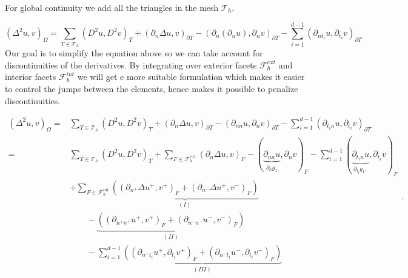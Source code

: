 For global continuity we add all the triangles in the mesh $\mathcal{T} _{h}$.

\begin{equation}
\label{eq:bi_basic_dg2}
\left( \Delta  ^{2} u,v \right) _{\Omega } = \sum_{T \in  \mathcal{T} _{h}}^{}  ( D^2 u, D^2v)_{T } + ( \partial _{n}  \Delta u, v )_{\partial T} -( \partial _{n} ( \partial_{n}u ), \partial _{n} v  )_{\partial T}-\sum_{i=1}^{d-1} ( \partial _{n t_{i}} u , \partial _{t_{i}} v  )_{\partial T}
\end{equation}
Our goal is to simplify the equation above so we can take account for discontinuities of the derivatives.
By integrating over exterior facets $\mathcal{F} _{h}^{ext}$ and interior facets $\mathcal{F} _{h}^{int}$ we will get e more suitable formulation which makes it easier to control the jumps between the elements, hence makes it possible to penalize discontinuities.

\begin{equation*}
    \begin{split}
 ( \Delta  ^{2} u,v ) _{\Omega }  =&\sum_{T\in \mathcal{T} _{h}}^{} ( D^2u,D^2v ) _{T }  + (\partial _{n} \Delta  u,v)_{\partial T} - (\partial _{nn} u, \partial _{n}v )_{\partial T}  - \sum_{i=1}^{d-1} ( \partial _{t_{i}n}u , \partial _{t_{i}} v  )_{\partial T}   \\
= &\sum_{T\in \mathcal{T} _{h}}^{} ( D^2u,D^2v ) _{T }  + \sum_{F \in \mathcal{F}_{h}^{ext} }^{}  (\partial _{n} \Delta  u,v)_{F} - (\underbrace{\partial _{nn} u}_{ \partial _{n} g_{1}} , \partial _{n}v )_{F}  - \sum_{i=1}^{d-1} ( \underbrace{\partial _{ t_{i}n} u }_{  \partial_{ t_{i} } g_{1},  }, \partial _{t_{i}} v
)_{F}     \\
   &  + \sum_{F \in \mathcal{F} _{h}^{int}}^{} \underbrace{\left( (\partial _{n^{+}} \Delta  u^{+}
        ,v^{+} )_{F}
+ \left(\partial _{n^{-}} \Delta  u^{+} ,v^{-}\right)_{F}  \right)}_{(I)}    \\
    &\quad \quad  -
\underbrace{\left( \left(\partial _{n^{+}n^{+}} u^{+}, v^{+} \right) _{F} + \left(\partial _{n^{-}n^{-}} u^{-}, v^{-}
\right) _{F} \right) }_{(II)} \\
   &  \quad \quad - \sum_{i=1}^{d-1}\underbrace{( (\partial _{n^{+}t_{i}} u^{+}, \partial_{t_{i}} v^{+} )_{F} +  \left(\partial _{n^{-}t_{i}} u^{-},
        \partial_{t_{i}} v^{-}
\right)_{F} ) }_{(III)} \\
    \end{split}
.\end{equation*}


